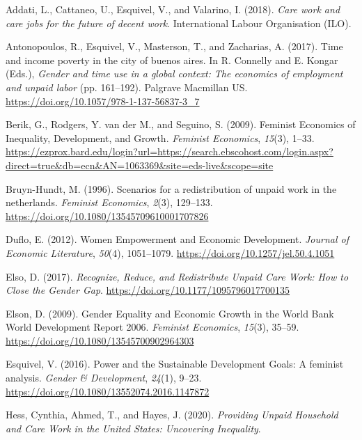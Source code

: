 \documentclass[
  11pt,
]{article}
\newlength{\cslhangindent}
\newenvironment{CSLReferences}[2] %
 {\begin{list}{}{%
  \setlength{\itemindent}{0pt}
  \setlength{\leftmargin}{0pt}
  \setlength{\parsep}{0pt}
  \ifodd #1
   \setlength{\leftmargin}{\cslhangindent}
   \setlength{\itemindent}{-1\cslhangindent}
  \fi
  \setlength{\itemsep}{#2\baselineskip}}}
 {\end{list}}
\begin{document}
\label{refs}
\begin{CSLReferences}{1}{0}
Addati, L., Cattaneo, U., Esquivel, V., and Valarino, I. (2018).
\emph{Care work and care jobs for the future of decent work}.
International Labour Organisation (ILO).

Antonopoulos, R., Esquivel, V., Masterson, T., and Zacharias, A. (2017).
Time and income poverty in the city of buenos aires. In R. Connelly and
E. Kongar (Eds.), \emph{Gender and time use in a global context: The
economics of employment and unpaid labor} (pp. 161--192). Palgrave
Macmillan US. \url{https://doi.org/10.1057/978-1-137-56837-3_7}

Berik, G., Rodgers, Y. van der M., and Seguino, S. (2009). Feminist
{Economics} of {Inequality}, {Development}, and {Growth}. \emph{Feminist
Economics}, \emph{15}(3), 1--33.
\url{https://ezprox.bard.edu/login?url=https://search.ebscohost.com/login.aspx?direct=true&db=ecn&AN=1063369&site=eds-live&scope=site}

Bruyn-Hundt, M. (1996). Scenarios for a redistribution of unpaid work in
the netherlands. \emph{Feminist Economics}, \emph{2}(3), 129--133.
\url{https://doi.org/10.1080/13545709610001707826}

Duflo, E. (2012). Women {Empowerment} and {Economic} {Development}.
\emph{Journal of Economic Literature}, \emph{50}(4), 1051--1079.
\url{https://doi.org/10.1257/jel.50.4.1051}

Elso, D. (2017). \emph{Recognize, {Reduce}, and {Redistribute} {Unpaid}
{Care} {Work}: {How} to {Close} the {Gender} {Gap}}.
\url{https://doi.org/10.1177/1095796017700135}

Elson, D. (2009). Gender {Equality} and {Economic} {Growth} in the
{World} {Bank} {World} {Development} {Report} 2006. \emph{Feminist
Economics}, \emph{15}(3), 35--59.
\url{https://doi.org/10.1080/13545700902964303}

Esquivel, V. (2016). Power and the {Sustainable} {Development} {Goals}:
A feminist analysis. \emph{Gender \& Development}, \emph{24}(1), 9--23.
\url{https://doi.org/10.1080/13552074.2016.1147872}

Hess, Cynthia, Ahmed, T., and Hayes, J. (2020). \emph{Providing {Unpaid}
{Household} and {Care} {Work} in the {United} {States}: {Uncovering}
{Inequality}}.


\end{CSLReferences}
\end{document}
